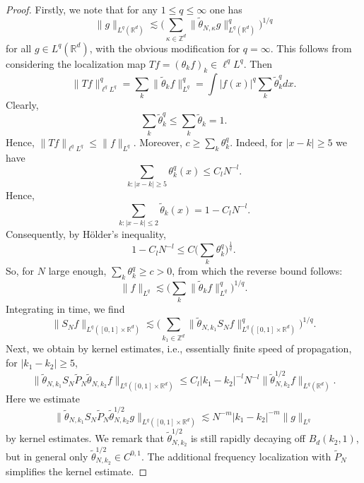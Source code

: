 \documentclass{amsart}
\numberwithin{equation}{section}
\theoremstyle{definition}
\newcommand{\R}{\mathbb{R}}
\newcommand{\Rd}{\mathbb{R}^{d}}
\newcommand{\Z}{\mathbb{Z}}
\newcommand {\ka}{\kappa}
\begin{document}
\begin{proof}
{Firstly, we note that for any $1\leq q\leq\infty$ one has 
\begin{equation*}
\| g \|_{L^q(\R^d)} \lesssim  \Big( \sum_{\ka \in \Z^d} \| \tilde{\theta}_{N,\ka} g \|_{L^q(\R^d)}^q \Big)^{1/q}
\end{equation*}
for all $g \in L^q(\Rd)$, with the obvious modification for $q=\infty$. This follows from 
considering the localization map $Tf = (\theta_k f)_k \in \ell^q L^q$. Then
\begin{equation*}
    \| T f \|_{\ell^q L^q}^q = \sum_k \| \tilde{\theta}_{k} f \|_{L^q}^q = \int |f(x)|^q \sum_k \tilde{\theta}_k^q dx.
\end{equation*}
Clearly,
\begin{equation*}
    \sum_k \tilde{\theta}_k^q \leq \sum_{k} \tilde{\theta}_k = 1.
\end{equation*}
Hence, $\| T f \|_{\ell^q L^q} \leq \| f \|_{L^q}$. Moreover, $c \geq \sum_k \theta_k^q$. Indeed, for $|x-k| \geq 5$ we have
\begin{equation*}
    \sum_{k:|x-k| \geq 5} \theta_k^q (x) \leq C_l N^{-l}.
\end{equation*}
Hence,
\begin{equation*}
    \sum_{k:|x-k| \leq 2} \tilde{\theta}_k(x) = 1 - C_l N^{-l}.
\end{equation*}
Consequently, by H\"older's inequality,
\begin{equation*}
1- C_l N^{-l} \leq C \big( \sum_k \theta_k^q \big)^{\frac{1}{q}}.
\end{equation*}
So, for $N$ large enough, $\sum_k \theta_k^q \geq c > 0$, from which the reverse bound follows:
\begin{equation*}
    \| f \|_{L^q} \lesssim \big( \sum_k \| \tilde{\theta}_k f \|_{L^q}^q \big)^{1/q}.
\end{equation*}
Integrating in time, we find
\begin{equation*}
\| S_N f \|_{L^q([0,1] \times \R^d)} \lesssim \Big( \sum_{k_1 \in \Z^d} \| \tilde{\theta}_{N,k_1} S_N f \|_{L^q([0,1] \times \R^d)}^q \Big)^{1/q}.
\end{equation*}
Next, we obtain 
by kernel estimates, i.e., essentially finite speed of propagation, for $|k_1-k_2| \geq 5$,
\begin{equation*}
\| \tilde{\theta}_{N,k_1} S_N \tilde{P}_N \tilde{\theta}_{N,k_2} f \|_{L^q([0,1] \times \R^d)} \leq C_l |k_1-k_2|^{-l} N^{-l} \| \tilde{\theta}^{1/2}_{N,k_2} f \|_{L^q(\Rd)}.
\end{equation*}
Here we estimate
\begin{equation*}
    \| \tilde{\theta}_{N,k_1} S_N \tilde{P}_N \tilde{\theta}_{N,k_2}^{1/2} g \|_{L^q([0,1] \times \R^d)} \lesssim N^{-m} |k_1-k_2|^{-m} \| g \|_{L^q}
\end{equation*}
by kernel estimates. We remark that $\tilde{\theta}_{N,k_2}^{1/2}$ is still rapidly decaying off $B_d(k_2,1)$, but in general only $\tilde{\theta}_{N,k_2}^{1/2} \in C^{0,1}$. The additional frequency localization with $\tilde{P}_N$ simplifies the kernel estimate.

}
\end{proof}
\end{document}
